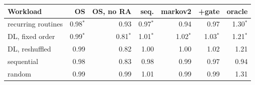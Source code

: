 \begin{tabular}{@{}lrrrrrr@{}}
\toprule
Workload & OS & OS, no RA & seq. & markov2 & +gate & oracle \\
\midrule
recurring routines & 0.98$^\ast$ & 0.93 & 0.97$^\ast$ & 0.94 & 0.97 & 1.30$^\ast$ \\
DL, fixed order & 0.99$^\ast$ & 0.81$^\ast$ & 1.01$^\ast$ & 1.02$^\ast$ & 1.03$^\ast$ & 1.21$^\ast$ \\
DL, reshuffled & 0.99 & 0.82 & 1.00 & 1.00 & 1.02 & 1.21 \\
sequential & 0.98 & 0.83 & 0.98 & 0.99 & 0.97 & 0.94 \\
random & 0.99 & 0.99 & 1.01 & 0.99 & 0.99 & 1.31 \\
\bottomrule
\end{tabular}
